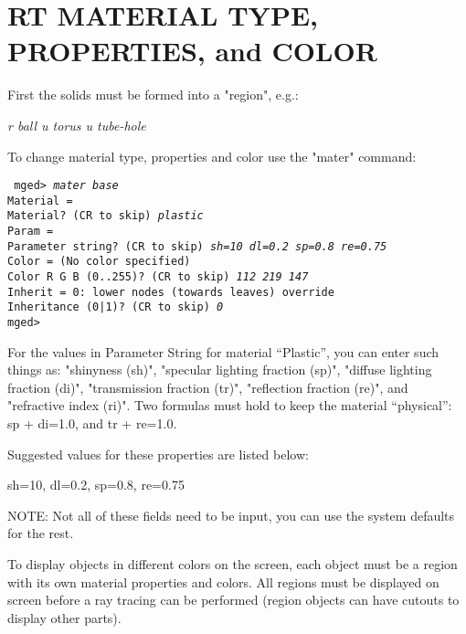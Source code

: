 \chapter{RT MATERIAL TYPE, PROPERTIES, and COLOR}

First the solids must be formed into a "region", e.g.:

{\em\center
r ball u torus u tube-hole
}

To change material type, properties and color use the "mater" command:

{\tt
mged> {\em mater base} \\
Material = \\
Material?  (CR to skip) {\em plastic} \\
Param = \\
Parameter string? (CR to skip) {\em sh=10 dl=0.2 sp=0.8 re=0.75} \\
Color = (No color specified) \\
Color R G B (0..255)? (CR to skip) {\em 112 219 147} \\
Inherit = 0:  lower nodes (towards leaves) override \\
Inheritance (0|1)? (CR to skip) {\em 0} \\
mged> \\
}

For the values in Parameter String for material ``Plastic'',
you can enter such things as:
"shinyness (sh)",
"specular lighting fraction (sp)",
"diffuse lighting fraction (di)",
"transmission fraction (tr)",
"reflection fraction (re)", and
"refractive index (ri)".
Two formulas must hold to keep the material ``physical'':
sp + di=1.0, and tr + re=1.0.

Suggested values for these properties are listed below:

{\center sh=10, dl=0.2, sp=0.8, re=0.75}

NOTE:  Not all of these fields need to be input, you
can use the system defaults for the rest.

To display objects in different colors on the screen, each object must
be a region with its own material properties and colors.  All regions must be
displayed on screen before a ray tracing can be performed (region objects can
have cutouts to display other parts).

